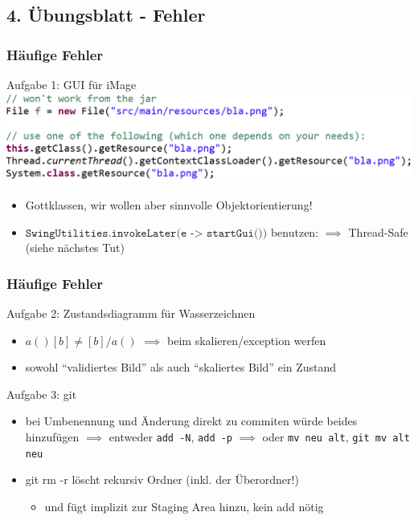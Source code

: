 \documentclass[18pt]{beamer}
\begin{document}
	\subsection{4. Übungsblatt - Fehler}
	\begin{frame}
		\frametitle{Häufige Fehler}
		\begin{block}{Aufgabe 1: GUI für iMage}
			\includegraphics[scale=0.34]{./pics/tut5/file-resource.png}
			\begin{itemize}
				\pause 
				\item Gottklassen, wir wollen aber sinnvolle Objektorientierung! \pause
				\item $\texttt{SwingUtilities.invokeLater(e -> startGui())}$ benutzen:
				\linebreak $\implies$ Thread-Safe (siehe nächstes Tut) \pause
			\end{itemize}
		\end{block}
	\end{frame}

	\begin{frame}
		\frametitle{Häufige Fehler}
		\begin{block}{Aufgabe 2: Zustandsdiagramm für Wasserzeichnen}
			\begin{itemize}
				\item $a() [b] \ne [b] /a()$ \linebreak $\implies$ beim skalieren/exception werfen
				\pause 
				\item sowohl \enquote{validiertes Bild} als auch \enquote{skaliertes Bild} ein Zustand
			\end{itemize}
		\end{block}
		\pause 
		\begin{block}{Aufgabe 3: git}
			\begin{itemize}
				\item bei Umbenennung und Änderung direkt zu commiten würde beides hinzufügen \pause
				\linebreak $\implies$ entweder \texttt{add -N}, \texttt{add -p} \pause
				\linebreak $\implies$ oder \texttt{mv neu alt}, \texttt{git mv alt neu} \pause
				\item git rm -r löscht rekursiv Ordner (inkl. der Überordner!)
				\begin{itemize}
					\item und fügt implizit zur Staging Area hinzu, kein add nötig
				\end{itemize}
			\end{itemize}
		\end{block}
	\end{frame}
\end{document}
